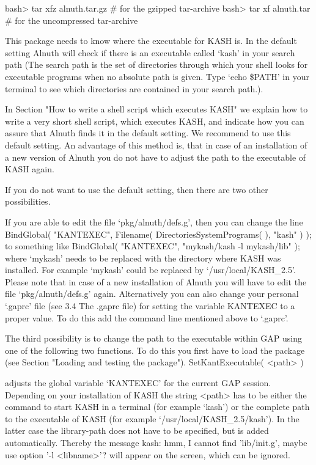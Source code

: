 \beginexample
    bash> tar xfz alnuth.tar.gz        # for the gzipped tar-archive
    bash> tar xf alnuth.tar         # for the uncompressed tar-archive
\endexample


This package needs to know where the executable for KASH is. 
In the default setting Alnuth will check if there is an executable
called `kash' in your search path (The search path is the 
set of directories through which your shell looks for executable 
programs when no absolute path is given. Type
`echo \$PATH'
in your terminal to see which directories are contained in your
search path.).

In Section "How to write a shell script which executes KASH"
we explain how to write a very short shell script,
which executes KASH, 
and indicate how you can assure that Alnuth finds it in the default
setting. 
We recommend to use this default setting.
An advantage of this method is, that in case 
of an installation of a new version of Alnuth you do not have to 
adjust the path to the executable of KASH again. 

If you do not want to use the default setting, then there are
two other possibilities.
 
If you are able to edit the file `pkg/alnuth/defs.g', then 
you can change the line 
\beginexample
    BindGlobal( "KANTEXEC", Filename( DirectoriesSystemPrograms( ), "kash" ) );
\endexample
to something like
\beginexample
    BindGlobal( "KANTEXEC", "mykash/kash -l mykash/lib" );
\endexample 
where `mykash' needs to be replaced with the directory where KASH
was installed. For example `mykash' could be replaced by
`/usr/local/KASH_2.5'. Please note that in case of a new installation 
of Alnuth you will have to edit the file `pkg/alnuth/defs.g'
again. Alternatively you can also change your personal `.gaprc' file (see 3.4
The .gaprc file) for setting the variable KANTEXEC to a proper value. To do
this add the command line mentioned above to `.gaprc'.
 
The third possibility is to change the path to the executable within GAP using
one of the following two functions. To do this you first have to load the
package (see Section "Loading and testing the package").
\> SetKantExecutable( <path> )

adjusts the global variable `KANTEXEC' for the current GAP session. Depending
on your installation of KASH the string <path> has to be either the command
to start KASH in a terminal (for example `kash') 
or the complete path to the executable of KASH 
(for example `/usr/local/KASH_2.5/kash'). In
the latter case the library-path does not have to be specified, but is added
automatically. Thereby the message
\beginexample
    kash: hmm, I cannot find 'lib/init.g', maybe use option '-l <libname>'?
\endexample
will appear on the screen, which can be ignored.

